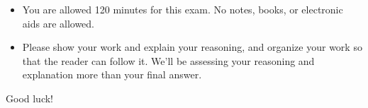 \bigskip

\begin{itemize}
\item You are allowed 120 minutes for this exam.  No notes,
  books, or electronic aids are allowed.

\item Please show your work and explain your reasoning, and organize
  your work so that the reader can follow it.  We'll be assessing your
  reasoning and explanation more than your final answer.

  
\end{itemize}

Good luck!
